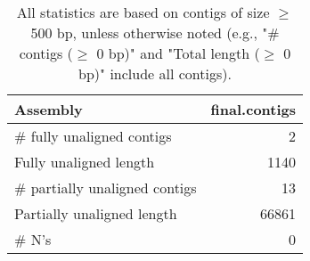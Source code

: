 \documentclass[12pt,a4paper]{article}
\begin{document}
\begin{table}[ht]
\begin{center}
\caption{All statistics are based on contigs of size $\geq$ 500 bp, unless otherwise noted (e.g., "\# contigs ($\geq$ 0 bp)" and "Total length ($\geq$ 0 bp)" include all contigs).}
\begin{tabular}{|l*{1}{|r}|}
\hline
Assembly & final.contigs \\ \hline
\# fully unaligned contigs & 2 \\ \hline
Fully unaligned length & 1140 \\ \hline
\# partially unaligned contigs & 13 \\ \hline
Partially unaligned length & 66861 \\ \hline
\# N's & 0 \\ \hline
\end{tabular}
\end{center}
\end{table}
\end{document}
